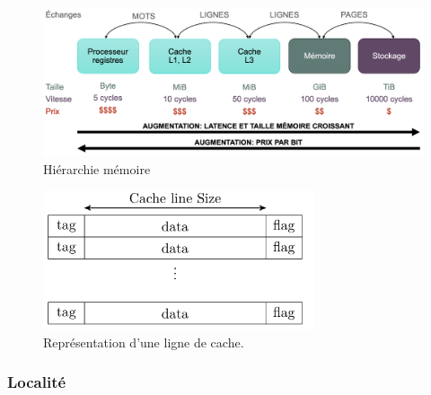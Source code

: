             \begin{figure}
                \center
                \includegraphics[width=14cm]{images/cpu_memory_hierarchy.png}
                \caption{\label{pic_cpu_memory_hierarchy} Hiérarchie mémoire}
            \end{figure}
            
            \begin{figure}
                \center
                \includegraphics[width=8cm]{images/cacheline_def.png}
                \caption{\label{pic:cacheline} Représentation d'une ligne de cache.}
            \end{figure}
        
        

    
    \subsubsection{Localité}\label{sec:locality}
    

